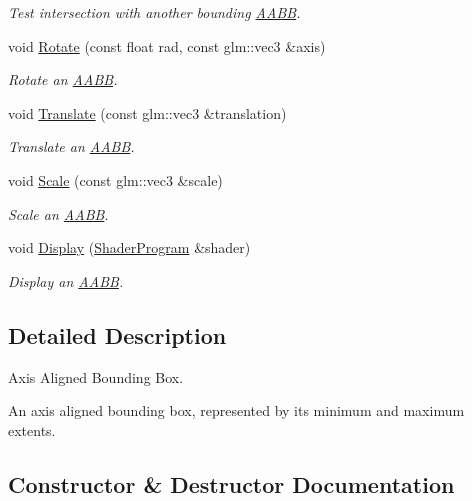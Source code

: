 \begin{DoxyCompactItemize}
\begin{DoxyCompactList}\small\item\em Test intersection with another bounding \hyperlink{class_f_l_i_g_h_t_1_1_a_a_b_b}{A\+A\+BB}. \end{DoxyCompactList}\item 
void \hyperlink{class_f_l_i_g_h_t_1_1_a_a_b_b_a3aac36f7814c77e64f8f34945c9b3442}{Rotate} (const float rad, const glm\+::vec3 \&axis)
\begin{DoxyCompactList}\small\item\em Rotate an \hyperlink{class_f_l_i_g_h_t_1_1_a_a_b_b}{A\+A\+BB}. \end{DoxyCompactList}\item 
void \hyperlink{class_f_l_i_g_h_t_1_1_a_a_b_b_af2f31e6ad8deb78728e145a5ab5f9529}{Translate} (const glm\+::vec3 \&translation)
\begin{DoxyCompactList}\small\item\em Translate an \hyperlink{class_f_l_i_g_h_t_1_1_a_a_b_b}{A\+A\+BB}. \end{DoxyCompactList}\item 
void \hyperlink{class_f_l_i_g_h_t_1_1_a_a_b_b_a8e3438c328d7d5138b64dfff165fb537}{Scale} (const glm\+::vec3 \&scale)
\begin{DoxyCompactList}\small\item\em Scale an \hyperlink{class_f_l_i_g_h_t_1_1_a_a_b_b}{A\+A\+BB}. \end{DoxyCompactList}\item 
void \hyperlink{class_f_l_i_g_h_t_1_1_a_a_b_b_ac991288fd69365a3220374a1413c2b0c}{Display} (\hyperlink{class_f_l_i_g_h_t_1_1_shader_program}{Shader\+Program} \&shader)
\begin{DoxyCompactList}\small\item\em Display an \hyperlink{class_f_l_i_g_h_t_1_1_a_a_b_b}{A\+A\+BB}. \end{DoxyCompactList}\end{DoxyCompactItemize}


\subsection{Detailed Description}
Axis Aligned Bounding Box. 

An axis aligned bounding box, represented by it\textquotesingle{}s minimum and maximum extents. 

\subsection{Constructor \& Destructor Documentation}
\mbox{\label{class_f_l_i_g_h_t_1_1_a_a_b_b_ad34475c7ab115bfafa467358e1e377b6}} 
